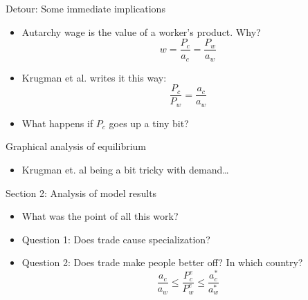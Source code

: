 \documentclass[ignorenonframetext,]{beamer}
\begin{document}
\begin{frame}{Detour: Some immediate implications}

    \begin{itemize}

        \item Autarchy wage is the value of a worker's product.  Why?
            \begin{equation*}
                w = \frac{P_c}{a_c} = \frac{P_w}{a_w}
            \end{equation*}
        \item Krugman et al. writes it this way:
            \begin{equation*}
                \frac{P_c}{P_w} = \frac{a_c}{a_w}
            \end{equation*}
        \item What happens if $P_c$ goes up a tiny bit?

    \end{itemize}

\end{frame}

\begin{frame}{Graphical analysis of equilibrium}

    \begin{itemize}
        \item Krugman et. al being a bit tricky with demand\dots
    \end{itemize}

\end{frame}

\begin{frame}

    Section 2: Analysis of model results
\end{frame}

\begin{frame}

    \begin{itemize}
        \item What was the point of all this work?
        \item Question 1: Does trade cause specialization?
        \item Question 2: Does trade make people better off?  In which country?
            \begin{equation*}
                \frac{a_c}{a_w} \leq \frac{P^e_c}{P^e_w} \leq \frac{a_c^*}{a_w^*}
            \end{equation*} 
    \end{itemize}

\end{frame}
\end{document}

